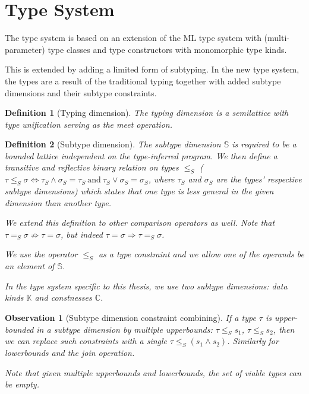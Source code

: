 \documentclass[12pt,a4paper]{article}
\newtheorem{definition}{Definition}
\newtheorem{observation}{Observation}
\begin{document}
\section{Type System}

The type system is based on an extension of the ML type system with (multi-parameter) type classes and type constructors with monomorphic type kinds.

This is extended by adding a limited form of subtyping. In the new type system, the types are a result of the traditional typing together with added subtype dimensions and their subtype constraints.

\begin{definition}[Typing dimension]
    The typing dimension is a semilattice with type unification serving as the meet operation.
\end{definition}

\begin{definition}[Subtype dimension]
    The subtype dimension $\mathbb{S}$ is required to be a bounded lattice independent on the type-inferred program. We then define a transitive and reflective binary relation on types $\leq_S$ ($\tau \leq_S \sigma \iff \tau_S \wedge \sigma_S = \tau_S\ \mathrm{and}\ \tau_S \vee \sigma_S = \sigma_S$, where $\tau_S$ and $\sigma_S$ are the types' respective subtype dimensions) which states that one type is less general in the given dimension than another type.

    We extend this definition to other comparison operators as well. Note that $\tau =_S \sigma \not\Rightarrow \tau = \sigma$, but indeed $\tau = \sigma \Rightarrow \tau =_S \sigma$.

    We use the operator $\leq_S$ as a type constraint and we allow one of the operands be an element of $\mathbb{S}$.

    In the type system specific to this thesis, we use two subtype dimensions: data kinds $\mathbb{K}$ and constnesses $\mathbb{C}$.
\end{definition}

\begin{observation}[Subtype dimension constraint combining]
    If a type $\tau$ is upper-bounded in a subtype dimension by multiple upperbounds: $\tau \leq_S s_1$, $\tau \leq_S s_2$, then we can replace such constraints with a single $\tau \leq_S (s_1 \wedge s_2)$. Similarly for lowerbounds and the join operation.

    Note that given multiple upperbounds and lowerbounds, the set of viable types can be empty. 
\end{observation}
\end{document}
